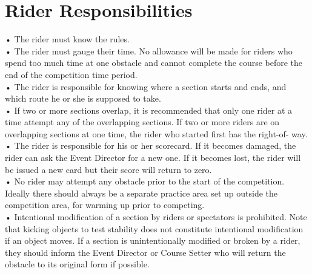 \section{Rider Responsibilities}
• The rider must know the rules.\\
• The rider must gauge their time. No allowance will be made for riders who spend too much time at one obstacle and
cannot complete the course before the end of the competition time period.\\
• The rider is responsible for knowing where a section starts and ends, and which route he or she is supposed to take.\\
• If two or more sections overlap, it is recommended that only one rider at a time attempt any of the overlapping
sections. If two or more riders are on overlapping sections at one time, the rider who started first has the right-of-
way.\\
• The rider is responsible for his or her scorecard. If it becomes damaged, the rider can ask the Event Director for a
new one. If it becomes lost, the rider will be issued a new card but their score will return to zero.\\
• No rider may attempt any obstacle prior to the start of the competition. Ideally there should always be a separate
practice area set up outside the competition area, for warming up prior to competing.\\
• Intentional modification of a section by riders or spectators is prohibited. Note that kicking objects to test stability
does not constitute intentional modification if an object moves. If a section is unintentionally modified or broken by a
rider, they should inform the Event Director or Course Setter who will return the obstacle to its original form if
possible.
